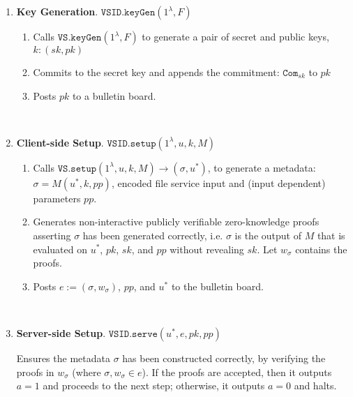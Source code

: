 

\begin{enumerate}
\item\textbf{Key Generation}\label{VSID::keygen}. $\mathtt{VSID.keyGen}(1^{\lambda},F)$ 
\begin{enumerate}
\item Calls  $\mathtt{VS.keyGen}(1^{\lambda},F)$ to generate a pair of secret and public keys, $k:(sk,pk)$
\item Commits to the secret key and appends the commitment: $\mathtt{Com}_{\scriptscriptstyle sk}$ to $pk$
\item Posts $pk$ to a bulletin board. %
\end{enumerate}

\

\item\textbf{Client-side Setup}\label{VSID::Client-side-Setup}. $\mathtt{VSID.setup}(1^{\lambda}, u,k,M)$
\begin{enumerate}
\item Calls  $\mathtt{VS.setup}(1^{\lambda}, u,k,M)\rightarrow (\sigma,u^{\scriptscriptstyle *})$, to generate a   metadata: $\sigma=M(u^{\scriptscriptstyle *},k,{pp})$, encoded file service input and { (input dependent) parameters $pp$}. %


\item Generates non-interactive publicly verifiable zero-knowledge proofs asserting  $\sigma$ has been generated correctly, i.e. $\sigma$ is the output of  $M$ that is evaluated on $u^{\scriptscriptstyle *}$, $pk$,  $sk$, and {$pp$} without revealing $sk$. Let $w_{\scriptscriptstyle\sigma}$ contains the proofs.
\item\label{vsid::post-metadata} Posts $ e:=(\sigma,w_{\scriptscriptstyle\sigma})$, {$pp$},  and $u^{\scriptscriptstyle *}$ to the bulletin board. 
\end{enumerate}

\

\item\textbf{Server-side Setup}. $\mathtt{VSID.serve}(u^{\scriptscriptstyle *},e,pk,{pp})$

Ensures the metadata $\sigma$ has been constructed correctly, by verifying the proofs in $w_{\sigma}$ (where $\sigma,w_{\scriptscriptstyle\sigma}\in e$). If the proofs are accepted, then it outputs $a=1$  and proceeds to the next step; otherwise, it outputs $a=0$ and halts. 


\end{enumerate}
